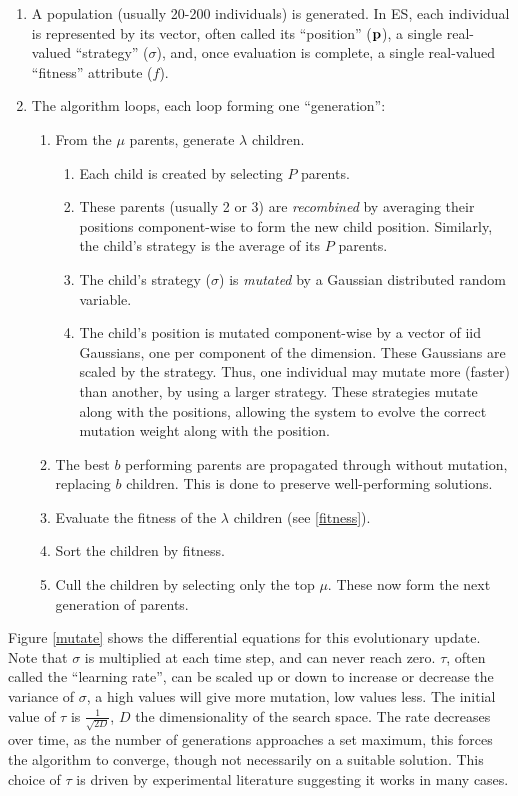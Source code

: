 \documentclass[11pt]{report}
\begin{document}
\begin{enumerate}
\item A population (usually 20-200 individuals) is generated. In ES, each individual is represented by its vector, often called its ``position'' ($\bf{p}$), a single real-valued ``strategy'' ($\sigma$), and, once evaluation is complete, a single real-valued ``fitness'' attribute ($f$).
\item The algorithm loops, each loop forming one ``generation'':
	\begin{enumerate}
	\item From the $\mu$ parents, generate $\lambda$ children.
		\begin{enumerate}
		\item Each child is created by selecting $P$ parents.
		\item These parents (usually 2 or 3) are \emph{recombined} by averaging their positions component-wise to form the new child position. Similarly, the child's strategy is the average of its $P$ parents.
		\item	The child's strategy ($\sigma$) is \emph{mutated} by a Gaussian distributed random variable.
		\item The child's position is mutated component-wise by a vector of iid Gaussians, one per component of the dimension. These Gaussians are scaled by the strategy. Thus, one individual may mutate more (faster) than another, by using a larger strategy. These strategies mutate along with the positions, allowing the system to evolve the correct mutation weight along with the position.
		\end{enumerate}
	\item The best $b$ performing parents are propagated through without mutation, replacing $b$ children. This is done to preserve well-performing solutions.
	\item Evaluate the fitness of the $\lambda$ children (see \ref{fitness}).
	\item Sort the children by fitness.
	\item Cull the children by selecting only the top $\mu$. These now form the next generation of parents.
	\end{enumerate}
\end{enumerate}

Figure \ref{mutate} shows the differential equations for this evolutionary update. Note that $\sigma$ is multiplied at each time step, and can never reach zero. $\tau$, often called the ``learning rate'', can be scaled up or down to increase or decrease the variance of $\sigma$, a high values will give more mutation, low values less. The initial value of $\tau$ is $\frac{1}{\sqrt{2D}}$, $D$ the dimensionality of the search space. The rate decreases over time, as the number of generations approaches a set maximum, this forces the algorithm to converge, though not necessarily on a suitable solution. This choice of $\tau$ is driven by experimental literature suggesting it works in many cases\cite{Beyer:2007}.
\end{document}

